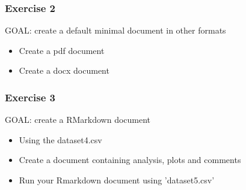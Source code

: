 \documentclass{beamer}
\begin{document}
\begin{frame}
    \frametitle{Exercise 2}
    {\sc GOAL: create a default minimal document in other formats}
    \begin{itemize}
        \item Create a pdf document
        \item Create a docx document
    \end{itemize}
\end{frame}

\begin{frame}
    \frametitle{Exercise 3}
    {\sc GOAL: create a RMarkdown document}
    \begin{itemize}
        \item Using the dataset4.csv
        \item Create a document containing analysis, plots and comments
	\pause
	\item Run your Rmarkdown document using 'dataset5.csv'
    \end{itemize}
\end{frame}
\end{document}
